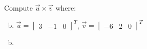\documentclass[../main.tex]{subfiles}
\begin{document}
Compute \(\vec{u} \times \vec{v}\) where:
\begin{enumerate}[a)]
	\setcounter{enumi}{1}
	\item 
		\(\vec{u} = \begin{bmatrix}3&-1&0\end{bmatrix}^T\),
		\(\vec{v} = \begin{bmatrix}-6&2&0\end{bmatrix}^T\)
\end{enumerate}

\solution
\begin{enumerate}[a)]
	\setcounter{enumi}{1}
	\item 
\end{enumerate}
\end{document}
